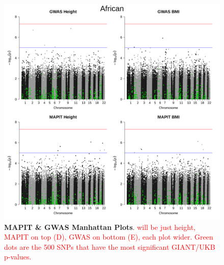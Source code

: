 \documentclass[12pt,a4paper]{article}
\begin{document}
\begin{figure}[htbp]
\centering
\includegraphics[scale=.35]{Images/Main/InterPath_Main_Figure_MAPITvsGWAS_Manhattan_vs1.png}
\caption[TBD]{\textbf{MAPIT \& GWAS Manhattan Plots}. \textcolor{red}{will be just height, MAPIT on top (D), GWAS on bottom (E), each plot wider. Green dots are the 500 SNPs that have the most significant GIANT/UKB p-values.}}
\label{InterPath-Main-Figure-MAPITvsGWAS-Manhattan}
\end{figure}

\end{document}
